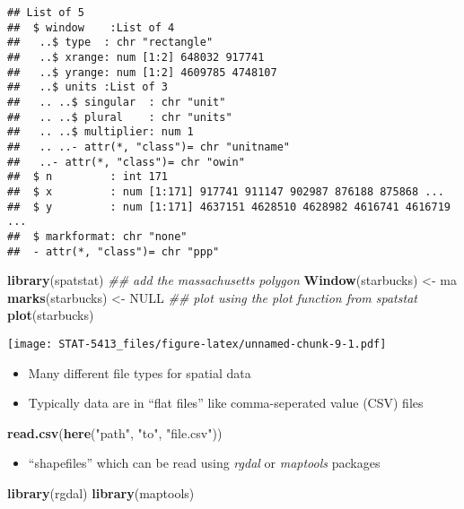 \documentclass[]{book}
\newenvironment{Shaded}{\begin{snugshade}}{\end{snugshade}}
\newcommand{\CommentTok}[1]{\textcolor[rgb]{0.56,0.35,0.01}{\textit{#1}}}
\newcommand{\KeywordTok}[1]{\textcolor[rgb]{0.13,0.29,0.53}{\textbf{#1}}}
\newcommand{\NormalTok}[1]{#1}
\newcommand{\OtherTok}[1]{\textcolor[rgb]{0.56,0.35,0.01}{#1}}
\newcommand{\StringTok}[1]{\textcolor[rgb]{0.31,0.60,0.02}{#1}}
\providecommand{\tightlist}{%
  \setlength{\itemsep}{0pt}\setlength{\parskip}{0pt}}
\begin{document}
\begin{verbatim}
## List of 5
##  $ window    :List of 4
##   ..$ type  : chr "rectangle"
##   ..$ xrange: num [1:2] 648032 917741
##   ..$ yrange: num [1:2] 4609785 4748107
##   ..$ units :List of 3
##   .. ..$ singular  : chr "unit"
##   .. ..$ plural    : chr "units"
##   .. ..$ multiplier: num 1
##   .. ..- attr(*, "class")= chr "unitname"
##   ..- attr(*, "class")= chr "owin"
##  $ n         : int 171
##  $ x         : num [1:171] 917741 911147 902987 876188 875868 ...
##  $ y         : num [1:171] 4637151 4628510 4628982 4616741 4616719 ...
##  $ markformat: chr "none"
##  - attr(*, "class")= chr "ppp"
\end{verbatim}

\begin{Shaded}
\begin{Highlighting}[]
\KeywordTok{library}\NormalTok{(spatstat)}
\CommentTok{## add the massachusetts polygon}
\KeywordTok{Window}\NormalTok{(starbucks) <-}\StringTok{ }\NormalTok{ma}
\KeywordTok{marks}\NormalTok{(starbucks) <-}\StringTok{ }\OtherTok{NULL}
\CommentTok{## plot using the plot function from spatstat}
\KeywordTok{plot}\NormalTok{(starbucks)}
\end{Highlighting}
\end{Shaded}

\texttt{[image: STAT-5413\_files/figure-latex/unnamed-chunk-9-1.pdf]}

\begin{itemize}
\item
  Many different file types for spatial data
\item
  Typically data are in ``flat files'' like comma-seperated value (CSV) files
\end{itemize}

\begin{Shaded}
\begin{Highlighting}[]
\KeywordTok{read.csv}\NormalTok{(}\KeywordTok{here}\NormalTok{(}\StringTok{"path"}\NormalTok{, }\StringTok{"to"}\NormalTok{, }\StringTok{"file.csv"}\NormalTok{))}
\end{Highlighting}
\end{Shaded}

\begin{itemize}
\tightlist
\item
  ``shapefiles'' which can be read using \emph{rgdal} or \emph{maptools} packages
\end{itemize}

\begin{Shaded}
\begin{Highlighting}[]
\KeywordTok{library}\NormalTok{(rgdal)}
\KeywordTok{library}\NormalTok{(maptools)}
\end{Highlighting}
\end{Shaded}
\end{document}
